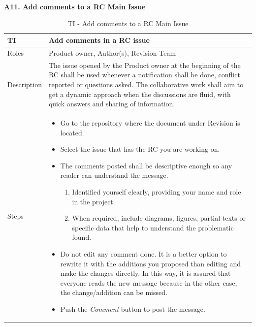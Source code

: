 \documentclass{template/openetcs_article}
\begin{document}
\textbf{A11. Add comments to a RC Main Issue}
\begin{table}[H]
\begin{tabular}{|m{2cm}|m{12cm}|}
\hline
\rowcolor{myblue}
TI & 
Add comments in a RC issue
\\\hline
Roles &
Product owner, Author(s), Revision Team
\\\hline
Description &
The issue opened by the Product owner at the beginning of the RC shall be used whenever a notification shall be done, conflict reported or questions asked. The collaborative work shall aim to get a dynamic approach when the discussions are fluid, with quick answers and sharing of information.
\\\hline
Steps &
\begin{itemize}
\item Go to the repository where the document under Revision is located.
\item Select the issue that has the RC you are working on.
\item The comments posted shall be descriptive enough so any reader can understand the message. 
\begin{enumerate}
\item Identified yourself clearly, providing your name and role in the project.
\item When required, include diagrams, figures, partial texts or specific data that help to understand the problematic found.
\end{enumerate}
\item Do not edit any comment done. It is a better option to rewrite it with the additions you proposed than editing and make the changes directly. In this way, it is assured that everyone reads the new message because in the other case, the change/addition can be missed.
\item Push the {\it Comment} button to post the message.
\end{itemize}
\\\hline
\end{tabular}
\caption{TI -  Add comments to a RC Main Issue}
\end{table}
\end{document}
